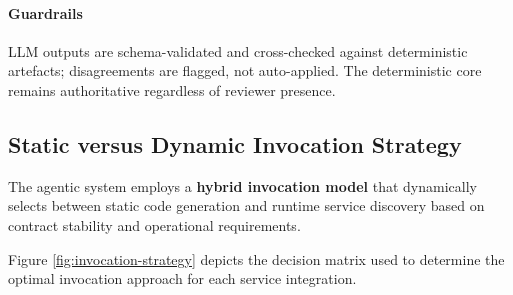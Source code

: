 \documentclass[11pt,a4paper]{article}
\begin{document}
\paragraph{Guardrails}
LLM outputs are schema-validated and cross-checked against deterministic artefacts; disagreements are flagged, not auto-applied. The deterministic core remains authoritative regardless of reviewer presence.

\subsection{Static versus Dynamic Invocation Strategy}
The agentic system employs a \textbf{hybrid invocation model} that dynamically selects between static code generation and runtime service discovery based on contract stability and operational requirements.

Figure \ref{fig:invocation-strategy} depicts the decision matrix used to determine the optimal invocation approach for each service integration.
\end{document}
